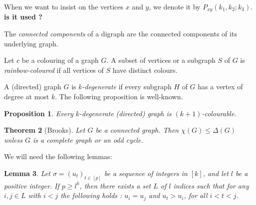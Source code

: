 \documentclass[utf8,10pt]{article}
\theoremstyle{plain}
\newtheorem{theorem}{Theorem}
\newtheorem{lemma}[theorem]{Lemma}
\newtheorem{proposition}[theorem]{Proposition}
\theoremstyle{definition}
\theoremstyle{remark}
\begin{document}
When we want to insist on the vertices $x$ and $y$, we denote it by $P_{xy}(k_1,k_2;k_3)$.
{\bf is it used ?}

The {\it connected components} of a digraph are the connected components of its underlying graph.

Let $c$ be a colouring of a graph $G$. A subset of vertices or a subgraph $S$ of $G$ is {\it rainbow-coloured} if all vertices of $S$ have distinct colours.


A (directed) graph $G$ is {\it $k$-degenerate} if every subgraph $H$ of $G$ has a vertex of degree at most $k$.
The following proposition is well-known.
\begin{proposition}\label{prop:deg}
Every $k$-degenerate (directed) graph is $(k+1)$-colourable.
\end{proposition}

\begin{theorem}[Brooks]\label{thm:brooks}
Let $G$ be a connected graph.
Then $\chi(G)\leq \Delta(G)$ unless $G$ is a complete graph or an odd cycle.
\end{theorem}






We will need the following lemmas:

%
%

\begin{lemma}\label{min}
Let $\sigma=(u_t)_{t\in [p]}$ be a sequence of integers in $[k]$, and let $l$ be a positive integer. If $p\geq l^k$, then there exists a set $L$ of $l$ indices such that for any $i,j \in L$ with $i < j$ the following holds : $u_i=u_j$ and $u_t > u_i$, for all $i < t < j$. \end{lemma}
\end{document}
